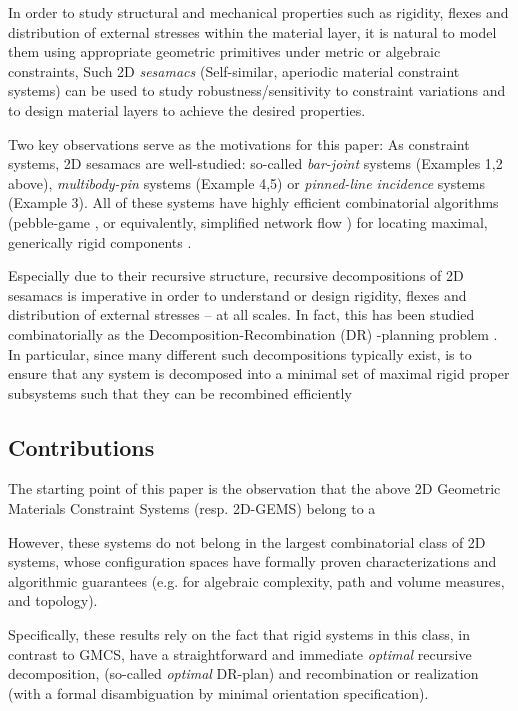 In order to study structural and mechanical properties such as rigidity, flexes and distribution of external stresses 
within the material layer, 
it is natural to model them using appropriate geometric primitives under metric or algebraic constraints, 
Such  2D {\em sesamacs} (Self-similar, aperiodic material constraint systems) can be used to 
study robustness/sensitivity to constraint variations and to design material layers 
to achieve the desired properties.

Two key observations serve as the motivations for this paper:
As constraint systems, 2D sesamacs  are  well-studied: so-called
{\it bar-joint} systems (Examples 1,2 above), {\it multibody-pin} systems (Example 4,5) or {\it pinned-line incidence} systems (Example 3).  
All of these systems have highly efficient combinatorial algorithms (pebble-game \cite{XX}, or equivalently, simplified network flow \cite{XX}) 
for locating maximal, generically rigid components \cite{XX}.

Especially due to their recursive structure, recursive decompositions of 2D sesamacs 
is imperative
in order to understand or design rigidity, flexes and distribution 
of external stresses  -- at all scales. In fact, this has been studied combinatorially as the Decomposition-Recombination (DR)
-planning problem \cite{XX}.  
In particular, since many different such decompositions typically exist, is to ensure that any system is decomposed into a minimal set 
of maximal rigid proper subsystems  
such that they can be recombined efficiently 
 


\subsection{Contributions}

The starting point of this paper is the observation that the above 2D Geometric Materials Constraint Systems (resp. 2D-GEMS) 
belong to a  

However, these systems do not 
belong in the largest combinatorial class of 2D systems, whose configuration spaces have formally proven  characterizations and 
algorithmic guarantees (e.g. for algebraic complexity, path and volume measures, and  topology).

Specifically, these results  rely on the fact that rigid systems in this  class, in contrast to GMCS, 
have a straightforward and immediate {\sl optimal} recursive decomposition, (so-called {\sl optimal} DR-plan) and  recombination 
or realization (with a formal disambiguation by minimal orientation specification).

